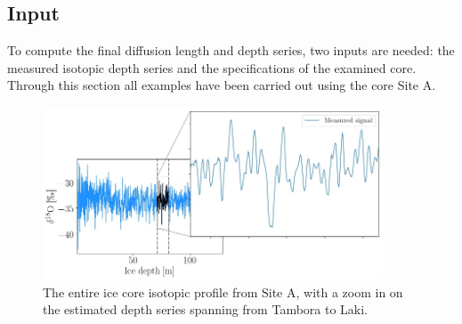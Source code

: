 \documentclass[../../CompleteThesis/Complete_1stDraft.tex]{subfiles}
\begin{document}
%		
%		
%		
%		




\subsection[Input]{Input}
\label{Subsec:Method_FirstSigmaEstimate_Input}
To compute the final diffusion length and depth series, two inputs are needed: the measured isotopic depth series and the specifications of the examined core. Through this section all examples have been carried out using the core Site A.\\
\begin{figure}
	\centering
	\includegraphics[width=0.9\textwidth]{SiteA_d18OInsert.jpg}
	\caption[Full $\delta^{18}$O record with insert, Site A]{The entire ice core isotopic profile from Site A, with a zoom in on the estimated depth series spanning from Tambora to Laki.}
	\label{fig:SiteA_d18OInsert}
\end{figure}
\end{document}
